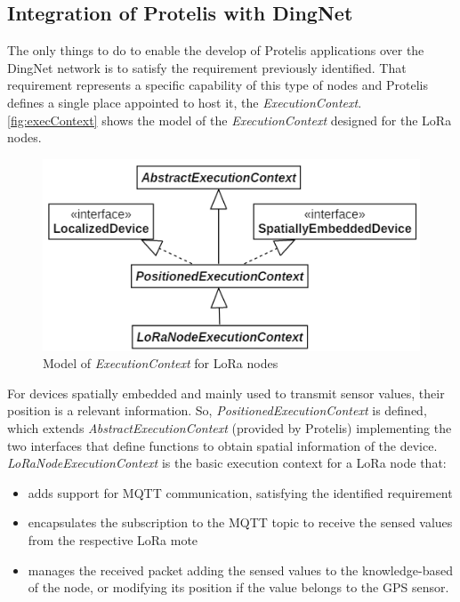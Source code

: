 \subsection{Integration of Protelis with DingNet}
\label{sec:PoverD}
The only things to do to enable the develop of Protelis applications over the DingNet network is to satisfy the requirement previously identified.
That requirement represents a specific capability of this type of nodes and Protelis defines a single place appointed to host it, the \mbox{\textit{ExecutionContext}}.
\autoref{fig:execContext} shows the model of the \mbox{\textit{ExecutionContext}} designed for the LoRa nodes. 
\begin{figure}[H]
    \centering
    \includegraphics{figures/execContext.png}
    \caption{Model of \textit{ExecutionContext} for LoRa nodes}
    \label{fig:execContext}
\end{figure}
\noindent For devices spatially embedded and mainly used to transmit sensor values, their position is a relevant information. So, \mbox{\textit{PositionedExecutionContext}} is defined, which extends \mbox{\textit{AbstractExecutionContext}} (provided by Protelis) implementing the two interfaces that define functions to obtain spatial information of the device.
\mbox{\textit{LoRaNodeExecutionContext}} is the basic execution context for a LoRa node that:
% 
\begin{itemize}
    \item adds support for MQTT communication, satisfying the identified requirement
    \item encapsulates the subscription to the MQTT topic to receive the sensed values from the respective LoRa mote
    \item manages the received packet adding the sensed values to the knowledge-based of the node, or modifying its position if the value belongs to the GPS sensor.
\end{itemize}
